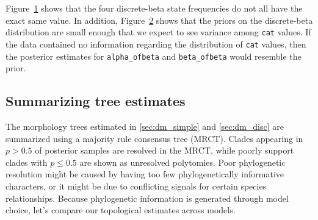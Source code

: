 \begin{figure}[h!]
\label{fig:tracer_cats}
\end{figure}

\begin{figure}[h!]
\label{fig:tracer_alpha_beta}
\end{figure}

Figure~\ref{fig:tracer_cats} shows that the four discrete-beta state frequencies do not all have the exact same value.
In addition, Figure~\ref{fig:tracer_alpha_beta} shows that the priors on the discrete-beta distribution are small enough that we expect to see variance among {\tt cat} values.
If the data contained no information regarding the distribution of {\tt cat} values, then the posterior estimates for {\tt alpha\_ofbeta} and {\tt beta\_ofbeta} would resemble the prior.

\subsection{Summarizing tree estimates}


The morphology trees estimated in \ref{sec:dm_simple} and \ref{sec:dm_disc} are summarized using a majority rule consensus tree (MRCT).
Clades appearing in $p>0.5$ of posterior samples are resolved in the MRCT, while poorly support clades with $p \leq 0.5$ are shown as unresolved polytomies.
Poor phylogenetic resolution might be caused by having too few phylogenetically informative characters, or it might be due to conflicting signals for certain species relationships.
Because phylogenetic information is generated through model choice, let's compare our topological estimates across models.

